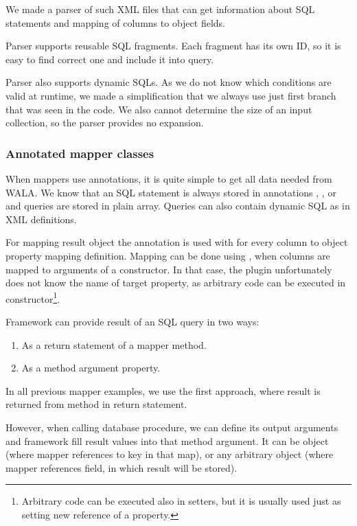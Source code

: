 We made a parser of such XML files that can get information about SQL statements
and mapping of columns to object fields.

Parser supports reusable SQL fragments. Each fragment has its own ID,
so it is easy to find correct one and include it into query.

Parser also supports dynamic SQLs. As we do not know which conditions are valid
at runtime, we made a simplification that we always use just first branch that
was seen in the code.
We also cannot determine the size of an input collection, so the parser provides no expansion.



\subsubsection{Annotated mapper classes}

When mappers use annotations, it is quite simple to get all data needed
from WALA. We know that an SQL statement is always stored in annotations
, ,  or 
and queries are stored in plain  array.
Queries can also contain dynamic SQL as in XML definitions.

For mapping result object the  annotation is used with 
for every column to object property mapping definition.
Mapping can be done using , when columns are mapped
to arguments of a constructor. In that case, the plugin unfortunately does not know
the name of target property, as arbitrary code can be executed in constructor\footnote{
  Arbitrary code can be executed also in setters, but it is usually used
  just as setting new reference of a property.
}.

Framework can provide result of an SQL query in two ways:
\begin{enumerate}
  \item As a return statement of a mapper method.
  \item As a method argument property.
\end{enumerate}

In all previous mapper examples, we use the first approach, where result
is returned from method in return statement.

However, when calling database procedure, we can define its output arguments
and framework fill result values into that method argument.
It can be  object (where mapper references to key in that map),
or any arbitrary object (where mapper references field, in which result will be stored).

